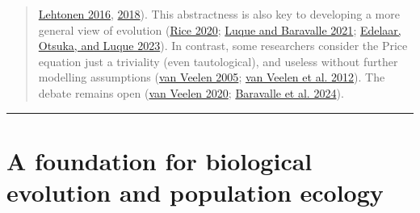 \documentclass[
]{article}
\begin{document}
\begin{quote}
\protect\hyperlink{ref-Lehtonen2016}{Lehtonen 2016},
\protect\hyperlink{ref-Lehtonen2018}{2018}). This abstractness is also
key to developing a more general view of evolution
(\protect\hyperlink{ref-Rice2020}{Rice 2020};
\protect\hyperlink{ref-Luque2021}{Luque and Baravalle 2021};
\protect\hyperlink{ref-Edelaar2023}{Edelaar, Otsuka, and Luque 2023}).
In contrast, some researchers consider the Price equation just a
triviality (even tautological), and useless without further modelling
assumptions (\protect\hyperlink{ref-VanVeelen2005}{van Veelen 2005};
\protect\hyperlink{ref-VanVeelen2012}{van Veelen et al. 2012}). The
debate remains open (\protect\hyperlink{ref-VanVeelen2020}{van Veelen
2020}; \protect\hyperlink{ref-Baravalle2024}{Baravalle et al. 2024}).
\end{quote}

\begin{center}\rule{0.5\linewidth}{0.5pt}\end{center}

\hypertarget{a-foundation-for-biological-evolution-and-population-ecology}{%
\section{A foundation for biological evolution and population
ecology}\label{a-foundation-for-biological-evolution-and-population-ecology}}
\end{document}
